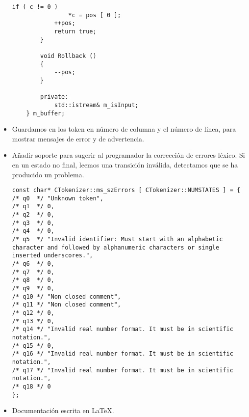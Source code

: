 \begin{itemize}
\begin{lstlisting}[caption={BufferedReader}]
            if ( c != 0 )
                *c = pos [ 0 ];
            ++pos;
            return true;
        }

        void Rollback ()
        {
            --pos;
        }

        private:
            std::istream& m_isInput;
    } m_buffer;
         \end{lstlisting}
    
    \item Guardamos en los token en número de columna y el número de linea, para mostrar mensajes de error y de advertencia. 
    
    \item Añadir soporte para sugerir al programador la corrección de errores léxico. Si en un estado no final, leemos una transición inválida, detectamos que se ha producido un problema.
    
        \begin{lstlisting}[caption={Estructura usada para definir los errores}]
const char* CTokenizer::ms_szErrors [ CTokenizer::NUMSTATES ] = {
/* q0  */ "Unknown token",
/* q1  */ 0,
/* q2  */ 0,
/* q3  */ 0,
/* q4  */ 0,
/* q5  */ "Invalid identifier: Must start with an alphabetic character and followed by alphanumeric characters or single inserted underscores.",
/* q6  */ 0,
/* q7  */ 0,
/* q8  */ 0,
/* q9  */ 0,
/* q10 */ "Non closed comment",
/* q11 */ "Non closed comment",
/* q12 */ 0,
/* q13 */ 0,
/* q14 */ "Invalid real number format. It must be in scientific notation.",
/* q15 */ 0,
/* q16 */ "Invalid real number format. It must be in scientific notation.",
/* q17 */ "Invalid real number format. It must be in scientific notation.",
/* q18 */ 0
};    
        \end{lstlisting}
    
    \item Documentación escrita en \LaTeX.
    
\end{itemize}
